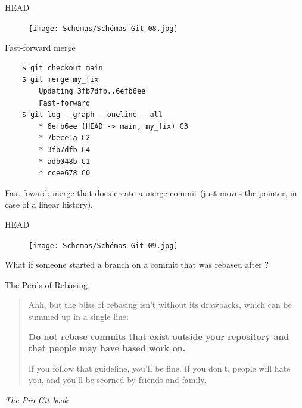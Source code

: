 \documentclass[10pt,aspectratio=169]{beamer}
\begin{document}
\begin{frame}[fragile]{HEAD}
    \begin{figure}
        \texttt{[image: Schemas/Schémas Git-08.jpg]}
    \end{figure}
\end{frame}

\begin{frame}[fragile]{Fast-forward merge}
    \begin{verbatim}
    $ git checkout main
    $ git merge my_fix
        Updating 3fb7dfb..6efb6ee
        Fast-forward
    $ git log --graph --oneline --all
        * 6efb6ee (HEAD -> main, my_fix) C3
        * 7bece1a C2
        * 3fb7dfb C4
        * adb048b C1
        * ccee678 C0
    \end{verbatim}

    Fast-foward: merge that does create a merge commit (just moves the pointer, in case of a linear history).
\end{frame}

\begin{frame}[fragile]{HEAD}
    \begin{figure}
        \texttt{[image: Schemas/Schémas Git-09.jpg]}
    \end{figure}
\end{frame}

{
\begin{frame}
    What if someone started a branch on a commit that was rebased after ?\\
\end{frame}
}

\begin{frame}[fragile]{The Perils of Rebasing}
    \begin{quote}
        Ahh, but the bliss of rebasing isn't without its drawbacks, which can be summed up in a single line:

        \textbf{Do not rebase commits that exist outside your repository and that people may have based work on.}

        If you follow that guideline, you'll be fine. If you don't, people will hate you, and you'll be scorned by friends and family.
    \end{quote}
    \begin{flushright}
        \textit{The Pro Git book}
    \end{flushright}
\end{frame}
\end{document}
